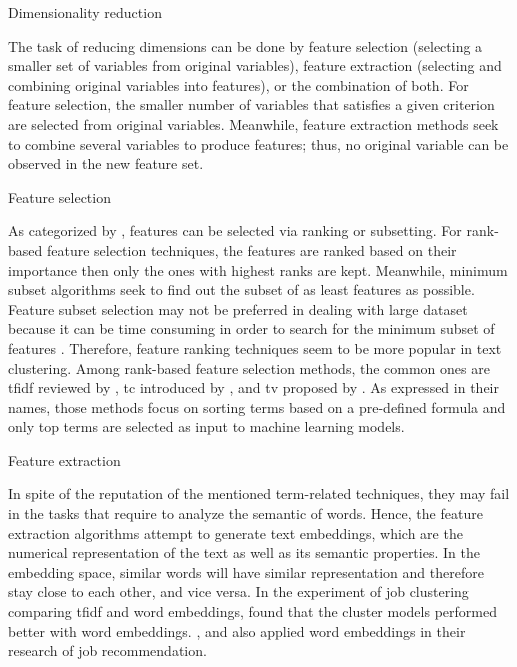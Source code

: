 \documentclass[a4paper,man,floatsintext,natbib,noextraspace]{apa6}
\makeatletter
\renewcommand{\subsection}{\@startsection{subsection}{2}
  {\z@}
  {\b@level@two@skip}
  {\e@level@two@skip}
  {\normalfont\normalsize\bfseries}}
\renewcommand{\subsubsection}{\@startsection{subsubsection}{3}
  {\z@}
  {\b@level@two@skip}
  {\e@level@two@skip}
  {\normalfont\normalsize\bfseries\itshape}}
\makeatother
\begin{document}
\subsection{Dimensionality reduction}

The task of reducing dimensions can be done by feature selection (selecting a smaller set of variables from original variables), feature extraction (selecting and combining original variables into features), or the combination of both. For feature selection, the smaller number of variables that satisfies a given criterion are selected from original variables. Meanwhile, feature extraction methods seek to combine several variables to produce features; thus, no original variable can be observed in the new feature set.

\subsubsection{Feature selection} 

As categorized by \cite{liuIntegratingFeatureSelection2005}, features can be selected via ranking or subsetting. For rank-based feature selection techniques, the features are ranked based on their importance then only the ones with highest ranks are kept. Meanwhile, minimum subset algorithms seek to find out the subset of as least features as possible. Feature subset selection may not be preferred in dealing with large dataset because it can be time consuming in order to search for the minimum subset of features \citep{alelyaniFeatureSelectionClustering2013}. Therefore, feature ranking techniques seem to be more popular in text clustering. Among rank-based feature selection methods, the common ones are \gls{tfidf} reviewed by \cite{liuComparativeStudyUnsupervised2005}, \gls{tc} introduced by \cite{liuEvaluationFeatureSelection2003}, and \gls{tv} proposed by \cite{liuComparativeStudyUnsupervised2005}. As expressed in their names, those methods focus on sorting terms based on a pre-defined formula and only top terms are selected as input to machine learning models.

\subsubsection{Feature extraction} 

In spite of the reputation of the mentioned term-related techniques, they may fail in the tasks that require to analyze the semantic of words. Hence, the feature extraction algorithms attempt to generate text embeddings, which are the numerical representation of the text as well as its semantic properties. In the embedding space, similar words will have similar representation and therefore stay close to each other, and vice versa. In the experiment of job clustering comparing \gls{tfidf} and word embeddings, \cite{vinelExperimentalComparisonUnsupervised2019} found that the cluster models performed better with word embeddings. \cite{calancaResponsibleTeamPlayers2019}, and \cite{mhamdiJobRecommendationBased2020} also applied word embeddings in their research of job recommendation. 
\end{document}
